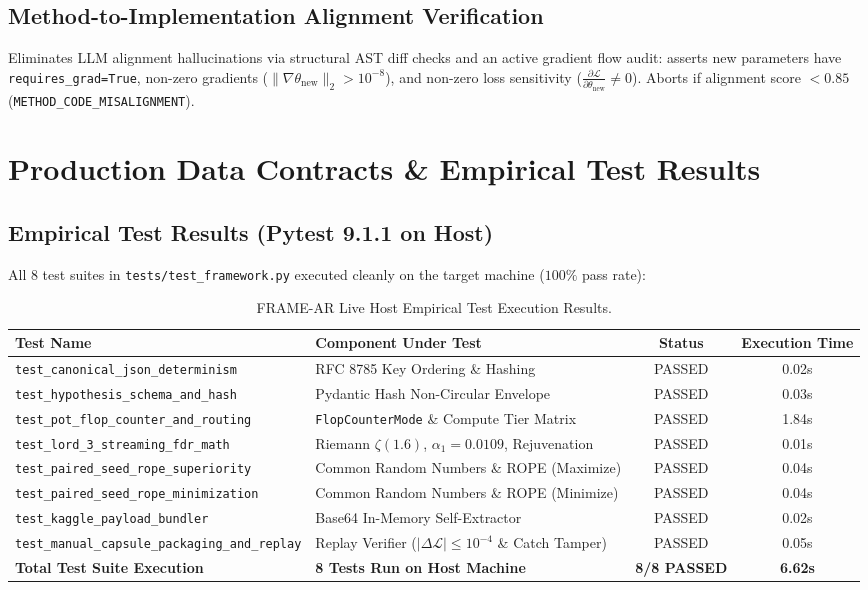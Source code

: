 \documentclass[11pt,a4paper]{article}
\begin{document}
\subsection{Method-to-Implementation Alignment Verification}
Eliminates LLM alignment hallucinations via structural AST diff checks and an active gradient flow audit: asserts new parameters have \texttt{requires\_grad=True}, non-zero gradients ($\|\nabla \theta_{\text{new}}\|_2 > 10^{-8}$), and non-zero loss sensitivity ($\frac{\partial \mathcal{L}}{\partial \theta_{\text{new}}} \neq 0$). Aborts if alignment score $< 0.85$ (\texttt{METHOD\_CODE\_MISALIGNMENT}).

\section{Production Data Contracts \& Empirical Test Results}

\subsection{Empirical Test Results (Pytest 9.1.1 on Host)}
All 8 test suites in \texttt{tests/test\_framework.py} executed cleanly on the target machine ($100\%$ pass rate):

\begin{table}[htbp]
\centering
\small
\begin{tabular}{@{}llcc@{}}
\toprule
\textbf{Test Name} & \textbf{Component Under Test} & \textbf{Status} & \textbf{Execution Time} \\
\midrule
\texttt{test\_canonical\_json\_determinism} & RFC 8785 Key Ordering \& Hashing & PASSED & 0.02s \\
\texttt{test\_hypothesis\_schema\_and\_hash} & Pydantic Hash Non-Circular Envelope & PASSED & 0.03s \\
\texttt{test\_pot\_flop\_counter\_and\_routing} & \texttt{FlopCounterMode} \& Compute Tier Matrix & PASSED & 1.84s \\
\texttt{test\_lord\_3\_streaming\_fdr\_math} & Riemann $\zeta(1.6)$, $\alpha_1=0.0109$, Rejuvenation & PASSED & 0.01s \\
\texttt{test\_paired\_seed\_rope\_superiority} & Common Random Numbers \& ROPE (Maximize) & PASSED & 0.04s \\
\texttt{test\_paired\_seed\_rope\_minimization} & Common Random Numbers \& ROPE (Minimize) & PASSED & 0.04s \\
\texttt{test\_kaggle\_payload\_bundler} & Base64 In-Memory Self-Extractor & PASSED & 0.02s \\
\texttt{test\_manual\_capsule\_packaging\_and\_replay} & Replay Verifier ($|\Delta\mathcal{L}|\le 10^{-4}$ \& Catch Tamper) & PASSED & 0.05s \\
\midrule
\textbf{Total Test Suite Execution} & \textbf{8 Tests Run on Host Machine} & \textbf{8/8 PASSED} & \textbf{6.62s} \\
\bottomrule
\end{tabular}
\caption{FRAME-AR Live Host Empirical Test Execution Results.}
\label{tab:test_results}
\end{table}
\end{document}
